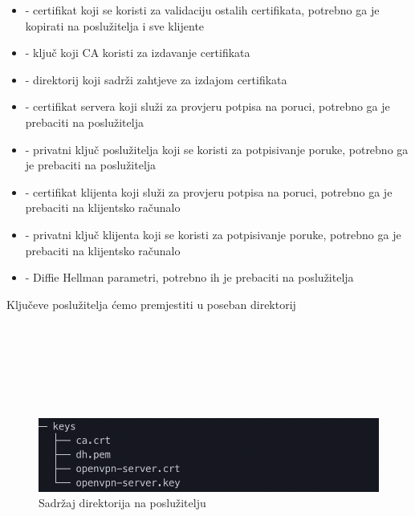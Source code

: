         \begin{itemize}
        \item {} - certifikat koji se koristi za validaciju ostalih
        certifikata, potrebno ga je kopirati na poslužitelja i sve klijente
        \item {} - ključ koji CA koristi za izdavanje certifikata
        \item {} - direktorij koji sadrži zahtjeve za izdajom
        certifikata 
        \item {} - certifikat servera koji služi za
        provjeru potpisa na poruci, potrebno ga je prebaciti na poslužitelja
        \item {} - privatni ključ poslužitelja
        koji se koristi za potpisivanje poruke, potrebno ga je prebaciti na
        poslužitelja
        \item {} - certifikat klijenta koji služi za
        provjeru potpisa na poruci, potrebno ga je prebaciti na klijentsko
        računalo
        \item {} - privatni ključ klijenta
        koji se koristi za potpisivanje poruke, potrebno ga je prebaciti na
        klijentsko računalo
        \item {} - Diffie Hellman parametri, potrebno ih je prebaciti na
        poslužitelja
        \end{itemize}

        \noindent
        Ključeve poslužitelja ćemo premjestiti u poseban direktorij \\

        \noindent
         \\
         \\
         \\
         \\
         \\
         \\

        \begin{figure}[H]
            \centering
            \includegraphics[scale=0.7]{slike/serverKeys}
            \caption{Sadržaj  direktorija na poslužitelju}
        \end{figure}

